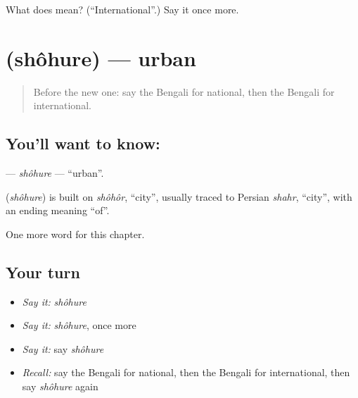 \begin{tcolorbox}[breakable,colback=teal!4,colframe=teal!35!black,title={Before you move on}]
What does  mean? (\textquotedblleft{}International\textquotedblright{}.) Say it once more.
\end{tcolorbox}
\section[\texorpdfstring{\bn{শহুরে} (shôhure)}{শহুরে (shôhure)}]{ (shôhure) — urban}

\label{lesson:BN-C221-shohure}



\begin{quote}
Before the new one: say the Bengali for national, then the Bengali for international.
\end{quote}

\subsection*{You'll want to know: }
\textbf{} — \emph{shôhure} — \textquotedblleft{}urban\textquotedblright{}.

\begin{cousinweb}
\textbf{} (\emph{shôhure}) is built on \emph{shôhôr}, \textquotedblleft{}city\textquotedblright{}, usually traced to Persian \emph{shahr}, \textquotedblleft{}city\textquotedblright{}, with an ending meaning \textquotedblleft{}of\textquotedblright{}.
\end{cousinweb}

\begin{grammarlens}[title={What you've built}]
One more word for this chapter.
\end{grammarlens}

\subsection*{Your turn}
\begin{itemize}
\raggedright
  \item \emph{Say it:} \emph{shôhure}
  \item \emph{Say it:} \emph{shôhure}, once more
  \item \emph{Say it:} say \emph{shôhure}
  \item \emph{Recall:} say the Bengali for national, then the Bengali for international, then say \emph{shôhure} again
\end{itemize}

